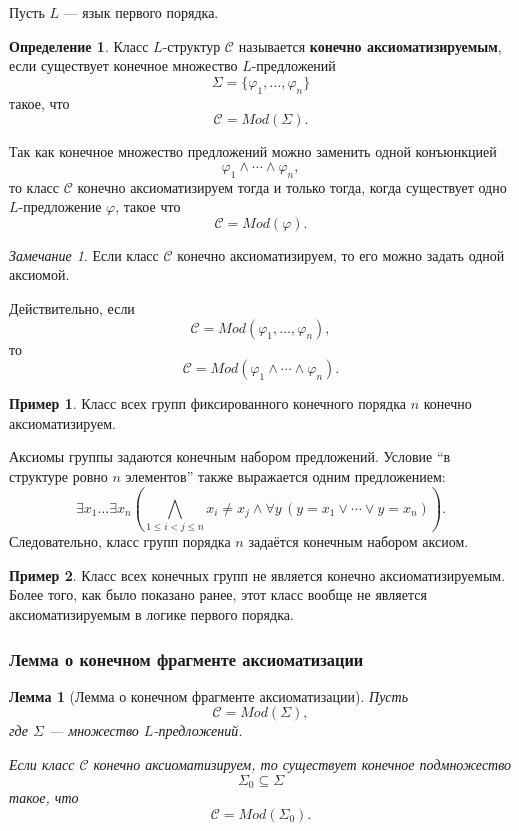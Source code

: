 \documentclass[12pt,a4paper,oneside,openany]{book}
\theoremstyle{definition}
\newtheorem{definition}{Определение}[chapter]
\newtheorem{example}{Пример}[chapter]
\theoremstyle{plain}
\newtheorem{lemma}{Лемма}[chapter]
\theoremstyle{remark}
\newtheorem{remark}{Замечание}[chapter]
\begin{document}
Пусть $L$ — язык первого порядка.

\begin{definition}
Класс $L$-структур $\mathcal C$ называется \textbf{конечно аксиоматизируемым}, если существует конечное множество $L$-предложений
\[
\Sigma=\{\varphi_1,\ldots,\varphi_n\}
\]
такое, что
\[
\mathcal C=Mod(\Sigma).
\]
\end{definition}

Так как конечное множество предложений можно заменить одной конъюнкцией
\[
\varphi_1\wedge\cdots\wedge\varphi_n,
\]
то класс $\mathcal C$ конечно аксиоматизируем тогда и только тогда, когда существует одно $L$-предложение $\varphi$, такое что
\[
\mathcal C=Mod(\varphi).
\]

\begin{remark}
Если класс $\mathcal C$ конечно аксиоматизируем, то его можно задать одной аксиомой.

Действительно, если
\[
\mathcal C=Mod(\varphi_1,\ldots,\varphi_n),
\]
то
\[
\mathcal C=Mod(\varphi_1\wedge\cdots\wedge\varphi_n).
\]
\end{remark}

\begin{example}
Класс всех групп фиксированного конечного порядка $n$ конечно аксиоматизируем.

Аксиомы группы задаются конечным набором предложений. Условие ``в структуре ровно $n$ элементов'' также выражается одним предложением:
\[
\exists x_1\ldots\exists x_n
\left(
\bigwedge_{1\le i<j\le n}x_i\ne x_j
\wedge
\forall y\,(y=x_1\vee\cdots\vee y=x_n)
\right).
\]
Следовательно, класс групп порядка $n$ задаётся конечным набором аксиом.
\end{example}

\begin{example}
Класс всех конечных групп не является конечно аксиоматизируемым. Более того, как было показано ранее, этот класс вообще не является аксиоматизируемым в логике первого порядка.
\end{example}

\subsubsection{Лемма о конечном фрагменте аксиоматизации}

\begin{lemma}[Лемма о конечном фрагменте аксиоматизации]
Пусть
\[
\mathcal C=Mod(\Sigma),
\]
где $\Sigma$ — множество $L$-предложений.

Если класс $\mathcal C$ конечно аксиоматизируем, то существует конечное подмножество
\[
\Sigma_0\subseteq\Sigma
\]
такое, что
\[
\mathcal C=Mod(\Sigma_0).
\]
\end{lemma}
\end{document}
